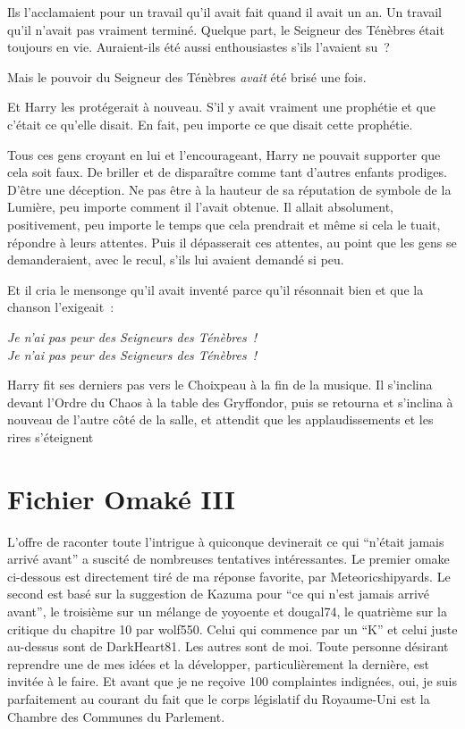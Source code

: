 Ils l'acclamaient pour un travail qu'il avait fait quand il avait un an. Un travail qu'il n'avait pas vraiment terminé. Quelque part, le Seigneur des Ténèbres était toujours en vie. Auraient-ils été aussi enthousiastes s'ils l'avaient su~?

Mais le pouvoir du Seigneur des Ténèbres \emph{avait} été brisé une fois.

Et Harry les protégerait à nouveau. S'il y avait vraiment une prophétie et que c'était ce qu'elle disait. En fait, peu importe ce que disait cette prophétie.

Tous ces gens croyant en lui et l'encourageant, Harry ne pouvait supporter que cela soit faux. De briller et de disparaître comme tant d'autres enfants prodiges. D'être une déception. Ne pas être à la hauteur de sa réputation de symbole de la Lumière, peu importe comment il l'avait obtenue. Il allait absolument, positivement, peu importe le temps que cela prendrait et même si cela le tuait, répondre à leurs attentes. Puis il dépasserait ces attentes, au point que les gens se demanderaient, avec le recul, s'ils lui avaient demandé si peu.

Et il cria le mensonge qu'il avait inventé parce qu'il résonnait bien et que la chanson l'exigeait~:

\begin{center}
\emph{Je n'ai pas peur des Seigneurs des Ténèbres~!}\\
\emph{Je n'ai pas peur des Seigneurs des Ténèbres~!}
\end{center}

Harry fit ses derniers pas vers le Choixpeau à la fin de la musique. Il s'inclina devant l'Ordre du Chaos à la table des Gryffondor, puis se retourna et s'inclina à nouveau de l'autre côté de la salle, et attendit que les applaudissements et les rires s'éteignent~

\section{Fichier Omaké III}

L'offre de raconter toute l'intrigue à quiconque devinerait ce qui “n'était jamais arrivé avant” a suscité de nombreuses tentatives intéressantes. Le premier omake ci-dessous est directement tiré de ma réponse favorite, par Meteoricshipyards. Le second est basé sur la suggestion de Kazuma pour “ce qui n'est jamais arrivé avant”, le troisième sur un mélange de yoyoente et dougal74, le quatrième sur la critique du chapitre 10 par wolf550. Celui qui commence par un “K” et celui juste au-dessus sont de DarkHeart81. Les autres sont de moi. Toute personne désirant reprendre une de mes idées et la développer, particulièrement la dernière, est invitée à le faire. Et avant que je ne reçoive 100 complaintes indignées, oui, je suis parfaitement au courant du fait que le corps législatif du Royaume-Uni est la Chambre des Communes du Parlement.

